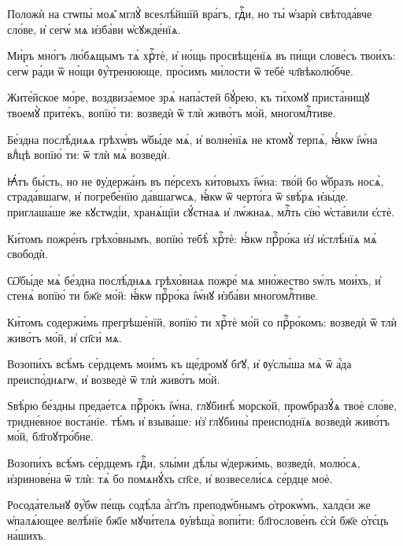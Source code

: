 \hKv Положѝ на стѡпы̀ моѧ̑ мглꙋ̀ всеѕлѣ́йшїй вра́гъ, гдⷭ҇и, но  ты̀ ѡ҆зарѝ свѣтода́вче сло́ве, и҆ сегѡ́ мѧ и҆зба́ви  ѡ҆сꙋжде́нїѧ. 

\hKv Ми́ръ мно́гъ лю́бѧщымъ тѧ̀ хрⷭ҇тѐ, и҆ но́щь просвѣще́нїѧ  въ пи́щи слове́съ твои́хъ: сегѡ̀ ра́ди ѿ но́щи  ᲂу҆́тренююще, про́симъ ми́лости ѿ тебѐ чл҃вѣколю́бче.   
%

\hKv Жите́йское мо́ре, воздвиза́емое зрѧ̀ напа́стей бꙋ́рею, къ  ти́хомꙋ приста́нищꙋ твоемꙋ̀ прите́къ, вопїю́ ти: возведѝ  ѿ тлѝ живо́тъ мо́й, многомлⷭ҇тиве. 
%

\hKv Бе́здна послѣ́днѧѧ грѣхѡ́въ  ѡ҆бы́де мѧ̀, и҆ волне́нїѧ не ктомꙋ̀ терпѧ̀, ꙗ҆́кѡ і҆ѡ́на  влⷣцѣ вопїю́ ти: ѿ тлѝ мѧ̀ возведѝ. 
%

\hKv Ꙗ҆́тъ бы́сть, но не ᲂу҆держа́нъ въ  пе́рсехъ ки́товыхъ і҆ѡ́на: тво́й бо ѡ҆́бразъ носѧ̀,  страда́вшагѡ, и҆ погребе́нїю да́вшагѡсѧ, ꙗ҆́кѡ ѿ черто́га  ѿ ѕвѣ́рѧ и҆зы́де. приглаша́ше же кꙋстѡді́и, хранѧ́щїи  сꙋ́єтнаѧ и҆ лѡ́жнаѧ, млⷭ҇ть сїю̀ ѡ҆ста́вили є҆стѐ. 
%

\hKv Ки́томъ пожре́нъ грѣхо́внымъ, вопїю̀ тебѣ̀ хрⷭ҇тѐ: ꙗ҆́кѡ  прⷪ҇ро́ка и҆з̾ и҆стлѣ́нїѧ мѧ̀ свободѝ.  

\hKv Ѡ҆бы́де мѧ̀ бе́здна послѣ́днѧѧ грѣхо́внаѧ пожре́ мѧ  мно́жество ѕѡ́лъ мои́хъ, и҆ стенѧ̀ вопїю́ ти бж҃е мо́й:  ꙗ҆́кѡ прⷪ҇ро́ка і҆ѡ́нꙋ и҆зба́ви многомлⷭ҇тиве. 

\hKv Ки́томъ содержи́мь прегрѣше́нїй, вопїю́ ти хрⷭ҇тѐ мо́й со  прⷪ҇ро́комъ: возведѝ ѿ тлѝ живо́тъ мо́й, и҆ сп҃си́ мѧ. 

\hKv Возопи́хъ всѣ́мъ се́рдцемъ мои́мъ къ ще́дромꙋ бг҃ꙋ, и҆  ᲂу҆слы́ша мѧ̀ ѿ а҆́да преиспо́днѧгѡ, и҆ возведѐ ѿ тлѝ  живо́тъ мо́й. 

\hKv Ѕвѣ́рю бе́здны предае́тсѧ прⷪ҇ро́къ і҆ѡ́на, глꙋбинѣ̀  морско́й, проѡбразꙋ́ѧ твоѐ сло́ве, тридне́вное воста́нїе.  тѣ́мъ и҆ взыва́ше: и҆з̾ глꙋбины̀ преиспо́днїѧ возведѝ  живо́тъ мо́й, бл҃гоꙋтро́бне. 

\hKv Возопи́хъ всѣ́мъ се́рдцемъ гдⷭ҇и, ѕлы́ми дѣ́лы ѡ҆держи́мь,  возведѝ, молю́сѧ, и҆зринове́на ѿ тлѝ: тѧ́ бо помѧнꙋ́хъ  сп҃се, и҆ возвесели́сѧ се́рдце моѐ.  
%

\hKv Росода́тельнꙋ ᲂу҆́бѡ пе́щь содѣ́ла а҆́гг҃лъ преподѡ́бнымъ  ѻ҆трокѡ́мъ, халдє́и же ѡ҆палѧ́ющее велѣ́нїе бж҃їе  мꙋчи́телѧ ᲂу҆вѣща̀ вопи́ти: бл҃гослове́нъ є҆сѝ бж҃е  ѻ҆тє́цъ на́шихъ. 
%

